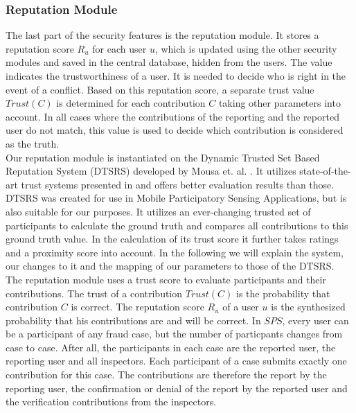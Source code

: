 \documentclass[
a4paper,     %
titlepage,   %
14pt         %
]{scrartcl}  %
\theoremstyle{mystyle}
\begin{document}
\subsubsection{Reputation Module} The last part of the security features is the reputation module. It stores a reputation score $R_u$ for each user $u$, which is updated using the other security modules and saved in the central database, hidden from the users. The value indicates the trustworthiness of a user. It is needed to decide who is right in the event of a conflict. Based on this reputation score, a separate trust value $Trust(C)$ is determined for each contribution $C$ taking other parameters into account. In all cases where the contributions of the reporting and the reported user do not match, this value is used to decide which contribution is considered as the truth. \\

Our reputation module is instantiated on the Dynamic Trusted Set Based Reputation System (DTSRS) developed by Mousa et. al. \cite{mousa2017reputation}. It utilizes state-of-the-art trust systems presented in \cite{mousa2015trust} and offers better evaluation results than those. DTSRS was created for use in Mobile Participatory Sensing Applications, but is also suitable for our purposes. It utilizes an ever-changing trusted set of participants to calculate the ground truth and compares all contributions to this ground truth value. In the calculation of its trust score it further takes ratings and a proximity score into account. In the following we will explain the system, our changes to it and the mapping of our parameters to those of the DTSRS. \\

The reputation module uses a trust score to evaluate participants and their contributions. The trust of a contribution $Trust(C)$ is the probability that contribution $C$ is correct. The reputation score $R_u$ of a user $u$ is the synthesized probability that his contributions are and will be correct. In $SPS$, every user can be a participant of any fraud case, but the number of particpants changes from case to case. After all, the participants in each case are the reported user, the reporting user and all inspectors. Each participant of a case submits exactly one contribution for this case. The contributions are therefore the report by the reporting user, the confirmation or denial of the report by the reported user and the verification contributions from the inspectors.\\
\end{document}
